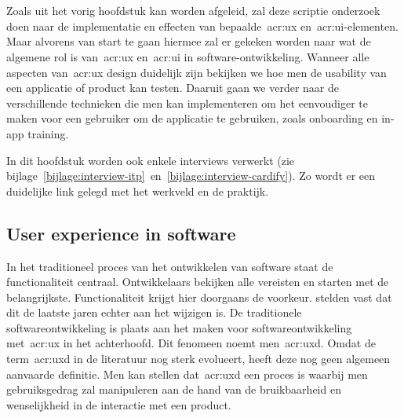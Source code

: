 \chapter{}
\label{ch:stand-van-zaken}


Zoals uit het vorig hoofdstuk kan worden afgeleid, zal deze scriptie onderzoek doen naar de implementatie en effecten van bepaalde~\acrshort{acr:ux} en~\acrshort{acr:ui}-elementen. Maar alvorens van start te gaan hiermee zal er gekeken worden naar wat de algemene rol is van~\acrshort{acr:ux} en~\acrshort{acr:ui} in software-ontwikkeling. Wanneer alle aspecten van~\acrshort{acr:ux} design duidelijk zijn bekijken we hoe men de usability van een applicatie of product kan testen. Daaruit gaan we verder naar de verschillende technieken die men kan implementeren om het eenvoudiger te maken voor een gebruiker om de applicatie te gebruiken, zoals onboarding en in-app training.

In dit hoofdstuk worden ook enkele interviews verwerkt (zie bijlage~\ref{bijlage:interview-itp}~en~\ref{bijlage:interview-cardify}). Zo wordt er een duidelijke link gelegd met het werkveld en de praktijk.

\section{User experience in software}
\label{sec:user-experience-in-software}

In het traditioneel proces van het ontwikkelen van software staat de functionaliteit centraal. Ontwikkelaars bekijken alle vereisten en starten met de belangrijkste. Functionaliteit krijgt hier doorgaans de voorkeur. \textcite{Harutyunyan2019} stelden vast dat dit de laatste jaren echter aan het wijzigen is. De traditionele softwareontwikkeling is plaats aan het maken voor softwareontwikkeling met~\acrlong{acr:ux} in het achterhoofd. Dit fenomeen noemt men~\acrfull{acr:uxd}. Omdat de term~\acrshort{acr:uxd} in de literatuur nog sterk evolueert, heeft deze nog geen algemeen aanvaarde definitie. Men kan stellen dat~\acrlong{acr:uxd} een proces is waarbij men gebruiksgedrag zal manipuleren aan de hand van de bruikbaarheid en wenselijkheid in de interactie met een product.

